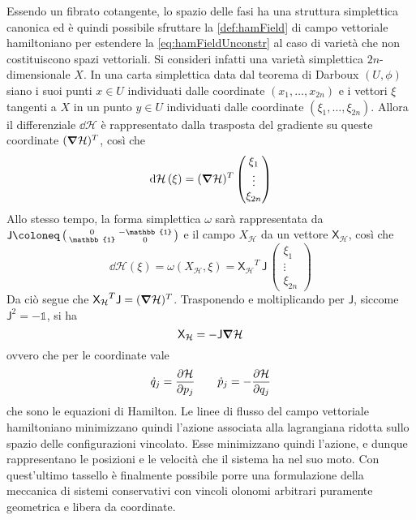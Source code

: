 Essendo un fibrato cotangente, lo spazio delle fasi ha una struttura simplettica canonica ed è quindi possibile sfruttare la \autoref{def:hamField} di campo vettoriale hamiltoniano per estendere la \autoref{eq:hamFieldUnconstr} al caso di varietà che non costituiscono spazi vettoriali. Si consideri infatti una varietà simplettica $2n$-dimensionale $X$. In una carta simplettica data dal teorema di Darboux $(U,\phi)$ siano i suoi punti $x \in U$ individuati dalle coordinate $(x_1, \ldots, x_{2n})$ e i vettori $\xi$ tangenti a $X$ in un punto $y \in U$ individuati dalle coordinate $(\xi_1, \ldots, \xi_{2n})$. Allora il differenziale $\dd{\mathcal{H}}$ è rappresentato dalla trasposta del gradiente su queste coordinate $(\grad{\mathcal{H}})^T$, così che \begin{equation}
\dd{\mathcal{H}}(\xi) = (\grad{\mathcal{H}})^T \begin{pmatrix} \xi_1\\ \vdots\\ \xi_{2n} \end{pmatrix}
\end{equation} 
Allo stesso tempo, la forma simplettica $\omega$ sarà rappresentata da $\mathsf{J} \defeq \left( \begin{smallmatrix}
  0 & -\mathbb{1} \\ \mathbb{1} & 0
\end{smallmatrix}  \right) $ e il campo $X_{\mathcal{H}}$ da un vettore $\mathsf{X_{\mathcal{H}}}$, così che
\begin{equation}
\dd{\mathcal{H}}(\xi) = \omega(X_{\mathcal{H}}, \xi) = \mathsf{X_{\mathcal{H}}}^T\, \mathsf{J}\, \begin{pmatrix} \xi_1\\ \vdots\\ \xi_{2n} \end{pmatrix}
\end{equation} 
Da ciò segue che $\mathsf{X_{\mathcal{H}}}^T \mathsf{J} = (\grad{\mathcal{H}})^T$. Trasponendo e moltiplicando per $\mathsf{J}$, siccome $\mathsf{J}^2 =- \mathbb{1}$, si ha
\begin{equation}
\mathsf{X}_{\mathcal{H}} = -\mathsf{J} \grad{\mathcal{H}} 
\end{equation}
ovvero che per le coordinate vale \begin{equation}
\dot{q}_j = \pdv{\mathcal{H}}{p_j} \qquad \dot{p}_j = - \pdv{\mathcal{H}}{q_j}
\end{equation}
che sono le equazioni di Hamilton. Le linee di flusso del campo vettoriale hamiltoniano minimizzano quindi l'azione associata alla lagrangiana ridotta sullo spazio delle configurazioni vincolato. Esse minimizzano quindi l'azione, e dunque rappresentano le posizioni e le velocità che il sistema ha nel suo moto. Con quest'ultimo tassello è finalmente possibile porre una formulazione della meccanica di sistemi conservativi con vincoli olonomi arbitrari puramente geometrica e libera da coordinate.

